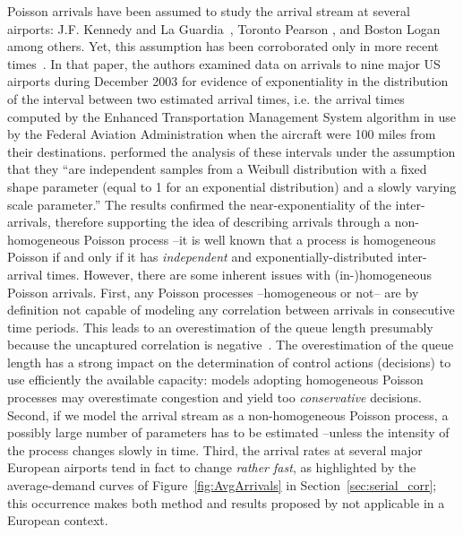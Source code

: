 \documentclass[draft,review]{elsarticle}
\makeatletter
\newcommand*{\ie}{i.e.\@\xspace}
\makeatother
\begin{document}
Poisson arrivals have been assumed to study the arrival stream at several airports:  J.F. Kennedy and La Guardia~\citep{Koop1972}, Toronto Pearson \citep{Bookbinder1986}, and Boston Logan~\citep{HO1975} among others. Yet, this assumption has been corroborated only in more recent times~\citep{willemain2004statistical}.
In that paper, the authors examined data on arrivals to nine major US airports during December 2003 for evidence of exponentiality in the distribution of the interval between two estimated arrival times, \ie{} the arrival times computed by the Enhanced Transportation Management System algorithm in use by the Federal Aviation Administration when the aircraft were 100 miles from their destinations. \citet{willemain2004statistical} performed the analysis of these intervals under the assumption that they ``are independent samples from a Weibull distribution with a fixed shape parameter (equal to 1 for an exponential distribution) and a slowly varying scale parameter.''
The results confirmed the near-exponentiality of the inter-arrivals, therefore supporting the idea of describing arrivals through a non-homogeneous Poisson process --it is well known that a process is homogeneous Poisson if and only if it has \emph{independent} and exponentially-distributed inter-arrival times.
However, there are some inherent issues with (in-)homogeneous Poisson arrivals.
First, any Poisson processes --homogeneous or not-- are by definition not capable of modeling any correlation between arrivals in consecutive time periods.
This leads to an overestimation of the queue length presumably because the uncaptured correlation is negative~\citep{caccavale2014model}.
The overestimation of the queue length has a strong impact on the determination of control actions (decisions) to use efficiently the available capacity: models adopting homogeneous Poisson processes may overestimate congestion and yield too \emph{conservative} decisions.
Second, if we model the arrival stream as a non-homogeneous Poisson process, a possibly large number of parameters has to be estimated --unless the intensity of the process changes slowly in time. %
Third, the arrival rates at several major European airports tend in fact to change \emph{rather fast}, as highlighted by the average-demand curves of Figure~\ref{fig:AvgArrivals} in Section~\ref{sec:serial_corr}; this occurrence makes both method and results proposed by \citet{willemain2004statistical} not applicable in a European context.
\end{document}
